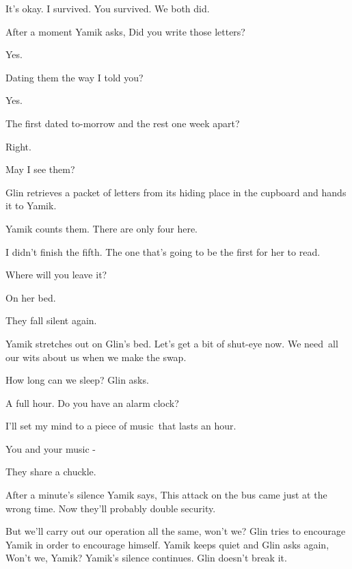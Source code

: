 \documentclass[letterpaper]{article}
\begin{document}
{\textquotedbl}It's okay. I survived. You survived. We both did.{\textquotedbl}

After a moment Yamik asks, {\textquotedbl}Did you write those letters?{\textquotedbl} 

{\textquotedbl}Yes.{\textquotedbl} 

{\textquotedbl}Dating them the way I told you?{\textquotedbl} 

{\textquotedbl}Yes.{\textquotedbl} 

{\textquotedbl}The first dated to-morrow and the rest one week apart?{\textquotedbl} 

{\textquotedbl}Right.{\textquotedbl} 

{\textquotedbl}May I see them?{\textquotedbl} 

Glin retrieves a packet of letters from its hiding place in the cupboard and hands it to Yamik. 

Yamik counts them. {\textquotedbl}There are only four here.{\textquotedbl} 

{\textquotedbl}I didn't finish the fifth. The one that's going to be the first for her to read.{\textquotedbl} 

{\textquotedbl}Where will you leave it?{\textquotedbl} 

{\textquotedbl}On her bed.{\textquotedbl}

They fall silent again.

Yamik stretches out on Glin's bed. {\textquotedbl}Let's get a bit of shut-eye now. We need~all our wits about us when we
make the swap. {\textquotedbl} 

{\textquotedbl}How long can we sleep?{\textquotedbl} Glin asks. 

{\textquotedbl}A full hour. Do you have an alarm clock?{\textquotedbl} 

{\textquotedbl}I'll set my mind to a piece of music~that lasts an hour.{\textquotedbl} 

{\textquotedbl}You and your music -{\textquotedbl}

They share a chuckle.\ 

After a minute's silence Yamik says, {\textquotedbl}This attack on the bus came just at the wrong time. Now they'll
probably double security.{\textquotedbl} 

{\textquotedbl}But we'll carry out our operation all the same, won't we?{\textquotedbl} Glin tries to encourage Yamik in
order to encourage himself. Yamik keeps quiet and Glin asks again, {\textquotedbl}Won't we, Yamik?{\textquotedbl}
Yamik's silence continues. Glin doesn't break it.
\end{document}
